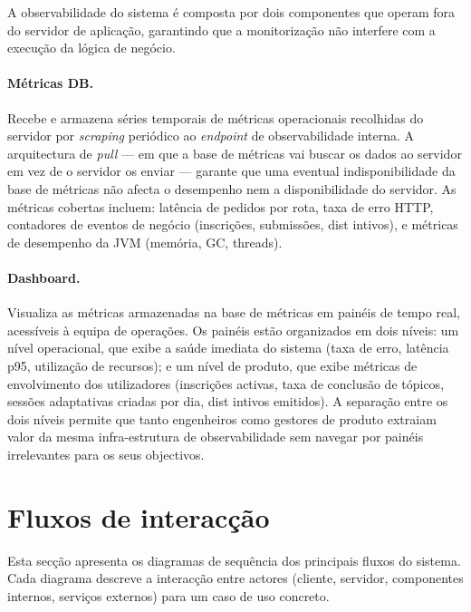 A observabilidade do sistema \'e composta por dois componentes que operam
fora do servidor de aplica\c{c}\~ao, garantindo que a monitoriza\c{c}\~ao
n\~ao interfere com a execu\c{c}\~ao da l\'ogica de neg\'ocio.

\paragraph{M\'etricas DB.}
Recebe e armazena s\'eries temporais de m\'etricas operacionais recolhidas
do servidor por \emph{scraping} peri\'odico ao \emph{endpoint} de
observabilidade interna. A arquitectura de \emph{pull} --- em que a base de
m\'etricas vai buscar os dados ao servidor em vez de o servidor os enviar ---
garante que uma eventual indisponibilidade da base de m\'etricas n\~ao afecta
o desempenho nem a disponibilidade do servidor. As m\'etricas cobertas
incluem: lat\^encia de pedidos por rota, taxa de erro HTTP, contadores de
eventos de neg\'ocio (inscri\c{c}\~oes, submiss\~oes, dist intivos), e
m\'etricas de desempenho da JVM (mem\'oria, GC, threads).

\paragraph{Dashboard.}
Visualiza as m\'etricas armazenadas na base de m\'etricas em pain\'eis de
tempo real, acess\'iveis \`a equipa de opera\c{c}\~oes. Os pain\'eis est\~ao
organizados em dois n\'iveis: um n\'ivel operacional, que exibe a sa\'ude
imediata do sistema (taxa de erro, lat\^encia p95, utiliza\c{c}\~ao de
recursos); e um n\'ivel de produto, que exibe m\'etricas de envolvimento dos
utilizadores (inscri\c{c}\~oes activas, taxa de conclus\~ao de t\'opicos,
sess\~oes adaptativas criadas por dia, dist intivos emitidos). A separa\c{c}\~ao
entre os dois n\'iveis permite que tanto engenheiros como gestores de produto
extraiam valor da mesma infra-estrutura de observabilidade sem navegar por
pain\'eis irrelevantes para os seus objectivos.

\section{Fluxos de interac\c{c}\~ao}
\label{sec:fluxos}

Esta sec\c{c}\~ao apresenta os diagramas de sequ\^encia dos principais fluxos
do sistema. Cada diagrama descreve a interac\c{c}\~ao entre actores (cliente,
servidor, componentes internos, servi\c{c}os externos) para um caso de uso
concreto.

